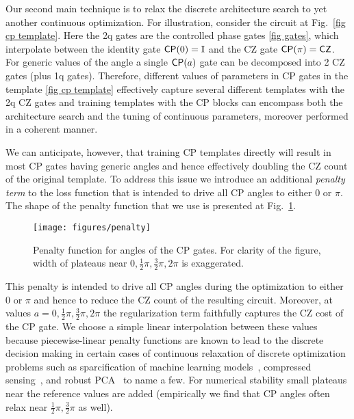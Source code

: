 \documentclass[twocolumn, amsfonts, amssymb, aps, nofootinbib]{revtex4-2}
\newcommand{\CZ}{\textsf{CZ }}
\newcommand{\CP}{\textsf{CP }}
\begin{document}
Our second main technique is to relax the discrete architecture search to yet another continuous optimization. For illustration, consider the circuit at Fig.~\ref{fig cp template}. Here the 2q gates are the controlled phase gates \eqref{fig gates}, which interpolate between the identity gate $\text{\textsf{CP}}(0)=\mathbb{I}$ and the \CZ gate $\text{\textsf{CP}}(\pi)=\text{\textsf{CZ}}$. For generic values of the angle a single $\text{\textsf{CP}}(a)$ gate can be decomposed into 2 \CZ gates (plus 1q gates). Therefore, different values of parameters in \CP gates in the template \eqref{fig cp template} effectively capture several different templates with the 2q \CZ gates and training templates with the \CP blocks can encompass both the architecture search and the tuning of continuous parameters, moreover performed in a coherent manner.

We can anticipate, however, that training \CP templates directly will result in most \CP gates having generic angles and hence effectively doubling the \CZ count of the original template. To address this issue we introduce an additional \textit{penalty term} to the loss function that is intended to drive all \CP angles to either $0$ or $\pi$. The shape of the penalty function that we use is presented at Fig.~\ref{fig penalty}.

\begin{figure}[h]
	\texttt{[image: figures/penalty]}
	\caption{Penalty function for angles of the \CP gates. For clarity of the figure, width of plateaus near $0,\frac12\pi, \frac32\pi, 2\pi$ is exaggerated.}
	\label{fig penalty}
\end{figure}

This penalty is intended to drive all \CP angles during the optimization to either $0$ or $\pi$ and hence to reduce the \CZ count of the resulting circuit. Moreover, at values $a=0,\frac12\pi, \frac32\pi, 2\pi$ the regularization term faithfully captures the \CZ cost of the \CP gate. We choose a simple linear interpolation between these values because piecewise-linear penalty functions are known to lead to the discrete decision making in certain cases of continuous relaxation of discrete optimization problems such as sparcification of machine learning models~\cite{tibshirani1996regression}, compressed sensing~\cite{donoho2006most, candes2006robust}, and robust PCA~\cite{candes2011robust} to name a few. For numerical stability small plateaus near the reference values are added (empirically we find that \CP angles often relax near $\frac12\pi, \frac32\pi$ as well).
\end{document}
